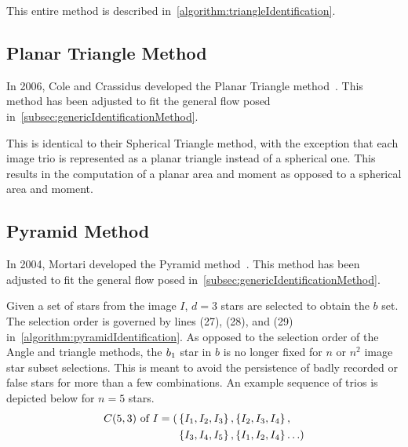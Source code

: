 This entire method is described in~\autoref{algorithm:triangleIdentification}.

\subsection{Planar Triangle Method}\label{subsec:coleAndCrassidus'sPlanarTriangleMethod}
In 2006, Cole and Crassidus developed the Planar Triangle method~\cite{Planar}.
This method has been adjusted to fit the general flow posed in~\autoref{subsec:genericIdentificationMethod}.

This is identical to their Spherical Triangle method, with the exception that each image trio is represented as a
planar triangle instead of a spherical one.
This results in the computation of a planar area and moment as opposed to a spherical area and moment.

\subsection{Pyramid Method}\label{subsec:pyramidMethod}
In 2004, Mortari developed the Pyramid method~\cite{Pyramid,AnalysisUncompensated}.
This method has been adjusted to fit the general flow posed in~\autoref{subsec:genericIdentificationMethod}.

Given a set of stars from the image $I$, $d = 3$ stars are selected to obtain the $b$ set.
The selection order is governed by lines (27), (28), and (29) in~\autoref{algorithm:pyramidIdentification}.
As opposed to the selection order of the Angle and triangle methods, the $b_1$ star in $b$ is no longer fixed
for $n$ or $n^2$ image star subset selections.
This is meant to avoid the persistence of badly recorded or false stars for more than a few combinations.
An example sequence of trios is depicted below for $n = 5$ stars.
\begin{equation}
    \begin{aligned}
        C(5, 3) \text{ of } I = ( &\left\{ I_1, I_2, I_3 \right\}, \left\{ I_2, I_3, I_4 \right\}, \\
        &\left\{ I_3, I_4, I_5 \right\}, \left\{ I_1, I_2, I_4  \right\}\ldots )
    \end{aligned}
\end{equation}

